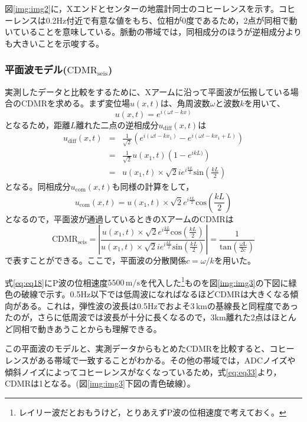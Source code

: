 図\ref{img:img2}に，Xエンドとセンターの地震計同士のコヒーレンスを示す。コヒーレンスは0.2Hz付近で有意な値をもち、位相が0度であるため，2点が同相で動いていることを意味している。脈動の帯域では，同相成分のほうが逆相成分よりも大きいことを示唆する。


\subsubsection{平面波モデル($\mathrm{CDMR_{seis}}$)}
実測したデータと比較をするために、Xアームに沿って平面波が伝搬している場合のCDMRを求める。まず変位場$u(x,t)$は、角周波数$\omega$と波数$k$を用いて、
\begin{equation}
  u(x,t) = e^{i(\omega{t}-k{x})}
\end{equation}
となるため，距離$L$離れた二点の逆相成分$u_{\mathrm{diff}}(x,t)$は
\begin{eqnarray}
  u_{\mathrm{diff}}(x,t) &=& \frac{1}{\sqrt{2}}\left( e^{i(\omega{t}-k{x_1})} -e^{i(\omega{t}-k{x_1+L})} \right)\\
  &=& \frac{1}{\sqrt{2}}u(x_1,t)\left( 1-e^{ikL)}  \right)\\
  &=& u(x_1,t)\times{\sqrt{2}{i}}e^{i\frac{kL}{2}}\mathrm{sin}(\frac{kL}{2})
\end{eqnarray}
となる。同相成分$u_\mathrm{com}(x,t)$も同様の計算をして，
\begin{equation}
  u_{\mathrm{com}}(x,t) = u(x_1,t)\times{\sqrt{2}}e^{i\frac{kL}{2}}\mathrm{cos}(\frac{kL}{2})
\end{equation}
となるので，平面波が通過しているときのXアームの$\mathrm{CDMR}$は
\begin{equation}
  \boxed{\mathrm{CDMR_{seis}} = \left| \frac{u(x_1,t)\times{\sqrt{2}}e^{i\frac{kL}{2}}\mathrm{cos}(\frac{kL}{2})}{u(x_1,t)\times{\sqrt{2}{i}}e^{i\frac{kL}{2}}\mathrm{sin}(\frac{kL}{2})}  \right| = \frac{1}{\mathrm{tan\left( \frac{\omega{L}}{2c}  \right)}}}
  \label{eq:eq18}
\end{equation}
で表すことができる。ここで，平面波の分散関係$c=\omega/k$を用いた。


式\ref{eq:eq18}にP波の位相速度$5500\, \mathrm{m/s}$を代入した\footnote[3]{レイリー波だとおもうけど，とりあえずP波の位相速度で考えておく。}ものを図\ref{img:img3}の下図に緑色の破線で示す。0.5Hz以下では低周波になればなるほどCDMRは大きくなる傾向がある。これは，弾性波の波長は0.5Hzでおよそ$3\,\mathrm{km}$の基線長と同程度であったのが，さらに低周波では波長が十分に長くなるので，3km離れた2点はほとんど同相で動きあうことからも理解できる。


この平面波のモデルと、実測データからもとめたCDMRを比較すると、コヒーレンスがある帯域で一致することがわかる。その他の帯域では，ADCノイズや傾斜ノイズによってコヒーレンスがなくなっているため，式\ref{eq:eq33}より，CDMRは1となる。(図\ref{img:img3}下図の青色破線）。


